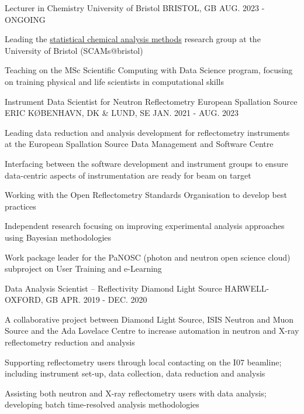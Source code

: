 \begin{cventries}
  \cventry
    {Lecturer in Chemistry}
    {University of Bristol}
    {BRISTOL, GB}
    {AUG. 2023 - ONGOING}
    {
      \begin{cvitems}
        \item {Leading the \href{https://scams-research.github.io}{statistical chemical analysis methods} research group at the University of Bristol (SCAMs@bristol)}
        \item {Teaching on the MSc Scientific Computing with Data Science program, focusing on training physical and life scientists in computational skills}
      \end{cvitems}
    }
  \cventry
    {Instrument Data Scientist for Neutron Reflectometry}
    {European Spallation Source ERIC}
    {K\O BENHAVN, DK \& LUND, SE}
    {JAN. 2021 - AUG. 2023}
    {
      \begin{cvitems}
        \item {Leading data reduction and analysis development for reflectometry instruments at the European Spallation Source Data Management and Software Centre}
        \item {Interfacing between the software development and instrument groups to ensure data-centric aspects of instrumentation are ready for beam on target}
        \item {Working with the Open Reflectometry Standards Organisation to develop best practices}
        \item {Independent research focusing on improving experimental analysis approaches using Bayesian methodologies}
        \item {Work package leader for the PaNOSC (photon and neutron open science cloud) subproject on User Training and e-Learning}
      \end{cvitems}
    }
  \cventry
    {Data Analysis Scientist -- Reflectivity}
    {Diamond Light Source}
    {HARWELL-OXFORD, GB}
    {APR. 2019 - DEC. 2020}
    {
      \begin{cvitems}
        \item {A collaborative project between Diamond Light Source, ISIS Neutron and Muon Source and the Ada Lovelace Centre to increase automation in neutron and X-ray reflectometry reduction and analysis}
        \item {Supporting reflectometry users through local contacting on the I07 beamline; including instrument set-up, data collection, data reduction and analysis}
        \item {Assisting both neutron and X-ray reflectometry users with data analysis; developing batch time-resolved analysis methodologies}
      \end{cvitems}
    }
\end{cventries}
